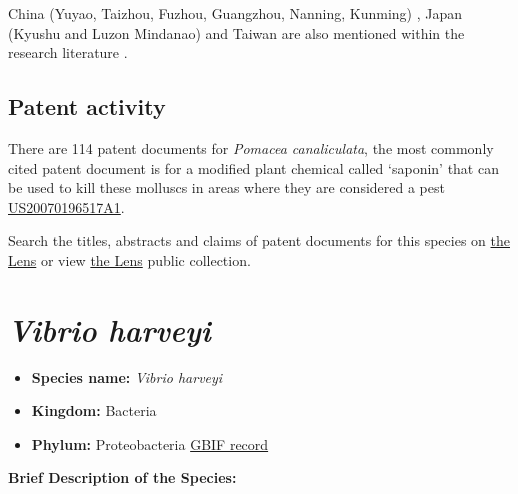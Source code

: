 \documentclass[openany]{book}
\providecommand{\tightlist}{%
  \setlength{\itemsep}{0pt}\setlength{\parskip}{0pt}}
\theoremstyle{definition}
\theoremstyle{definition}
\theoremstyle{definition}
\theoremstyle{remark}
\begin{document}
China (Yuyao, Taizhou, Fuzhou, Guangzhou, Nanning, Kunming)
\citep{Bai_2011}, Japan (Kyushu and Luzon Mindanao) \citep{Wada_2011}
and Taiwan are also mentioned within the research literature
\citep{Baker_1998}.

\hypertarget{patent-activity-7}{%
\subsection{Patent activity}\label{patent-activity-7}}

There are 114 patent documents for \emph{Pomacea canaliculata}, the most
commonly cited patent document is for a modified plant chemical called
`saponin' that can be used to kill these molluscs in areas where they
are considered a pest
\href{https://www.lens.org/lens/patent/US_2007_0196517_A1}{US20070196517A1}.

Search the titles, abstracts and claims of patent documents for this
species on
\href{https://www.lens.org/lens/search?q=title:(\%22Pomacea\%20canaliculata\%22)\%20OR\%20abstract:(\%22Pomacea\%20canaliculata\%22)\%20OR\%20claims:(\%22Pomacea\%20canaliculata\%22)\&l=en\&preview=true}{the
Lens} or view \href{https://www.lens.org/lens/collection/24984}{the
Lens} public collection.

\hypertarget{vibrio-harveyi}{%
\section{\texorpdfstring{\emph{Vibrio
harveyi}}{Vibrio harveyi}}\label{vibrio-harveyi}}

\begin{itemize}
\tightlist
\item
  \textbf{Species name:} \emph{Vibrio harveyi}
\item
  \textbf{Kingdom:} Bacteria\\
\item
  \textbf{Phylum:} Proteobacteria
  \href{https://www.gbif.org/species/5427692}{GBIF record}
\end{itemize}

\textbf{Brief Description of the Species:}
\end{document}
